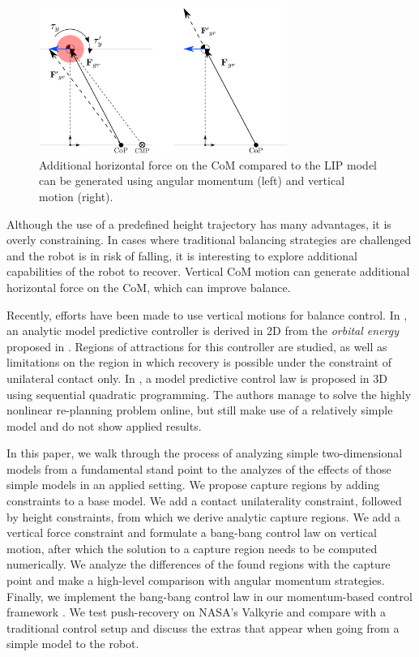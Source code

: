 \documentclass[letterpaper, 10 pt, conference]{ieeeconf}  %
\begin{document}
\begin{figure}[h]
      \centering
      \includegraphics[width=3.2in]{modelvarzvsang2.png}
      \caption{Additional horizontal force on the CoM compared to the LIP model can be generated using angular momentum (left) and vertical motion (right). }
      \label{fig:angvsvarz}
\end{figure}

Although the use of a predefined height trajectory has many advantages, it is overly constraining. In cases where traditional balancing strategies are challenged and the robot is in risk of falling, it is interesting to explore additional capabilities of the robot to recover. Vertical CoM motion can generate additional horizontal force on the CoM, which can improve balance.

Recently, efforts have been made to use vertical motions for balance control. In \cite{koolen2016balance}, an analytic model predictive controller is derived in 2D from the \textit{orbital energy} proposed in \cite{pratt2007derivation}. Regions of attractions for this controller are studied, as well as limitations on the region in which recovery is possible under the constraint of unilateral contact only. In \cite{caron2018capturability}, a model predictive control law is proposed in 3D using sequential quadratic programming. The authors manage to solve the highly nonlinear re-planning problem online, but still make use of a relatively simple model and do not show applied results.

In this paper, we walk through the process of analyzing simple two-dimensional models from a fundamental stand point to the analyzes of the effects of those simple models in an applied setting. We propose capture regions by adding constraints to a base model. We add a contact unilaterality constraint, followed by height constraints, from which we derive analytic capture regions. We add a vertical force constraint and formulate a bang-bang control law on vertical motion, after which the solution to a capture region needs to be computed numerically. We analyze the differences of the found regions with the capture point and make a high-level comparison with angular momentum strategies. Finally, we implement the bang-bang control law in our momentum-based control framework \cite{koolen2016design}. We test push-recovery on NASA's Valkyrie \cite{radford2015valkyrie} and compare with a traditional control setup and discuss the extras that appear when going from a simple model to the robot.
\end{document}
